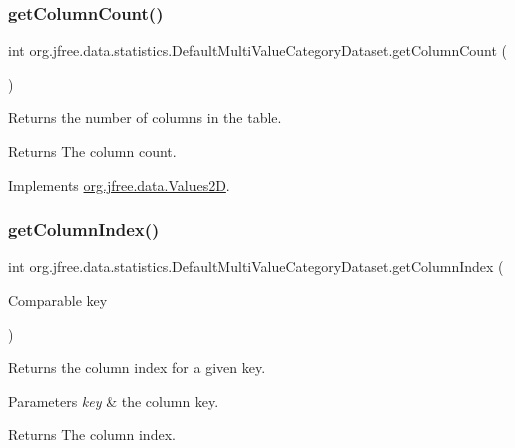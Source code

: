 \subsubsection{\texorpdfstring{get\+Column\+Count()}{getColumnCount()}}
{\footnotesize\ttfamily int org.\+jfree.\+data.\+statistics.\+Default\+Multi\+Value\+Category\+Dataset.\+get\+Column\+Count (\begin{DoxyParamCaption}{ }\end{DoxyParamCaption})}

Returns the number of columns in the table.

\begin{DoxyReturn}{Returns}
The column count. 
\end{DoxyReturn}


Implements \mbox{\hyperlink{interfaceorg_1_1jfree_1_1data_1_1_values2_d_a212e32802dc2f32e0fb641740137c685}{org.\+jfree.\+data.\+Values2D}}.

\mbox{\label{classorg_1_1jfree_1_1data_1_1statistics_1_1_default_multi_value_category_dataset_a1645d262991fd239a0a847d117dd975d}} 
\subsubsection{\texorpdfstring{get\+Column\+Index()}{getColumnIndex()}}
{\footnotesize\ttfamily int org.\+jfree.\+data.\+statistics.\+Default\+Multi\+Value\+Category\+Dataset.\+get\+Column\+Index (\begin{DoxyParamCaption}\item[{Comparable}]{key }\end{DoxyParamCaption})}

Returns the column index for a given key.


\begin{DoxyParams}{Parameters}
{\em key} & the column key.\\
\hline
\end{DoxyParams}
\begin{DoxyReturn}{Returns}
The column index. 
\end{DoxyReturn}



